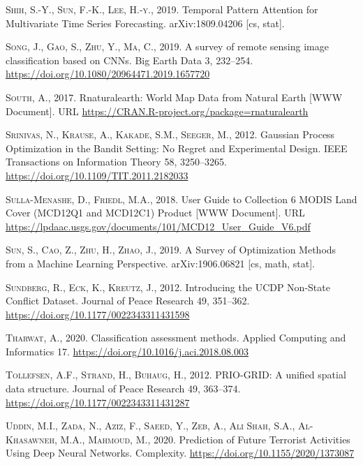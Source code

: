 \documentclass[a4paper,11pt]{article}
\begin{document}
\leavevmode\hypertarget{ref-shih2019}{}%
\textsc{Shih, S.-Y., Sun, F.-K., Lee, H.-y.}, 2019. Temporal Pattern Attention for Multivariate Time Series Forecasting. arXiv:1809.04206 {[}cs, stat{]}.

\leavevmode\hypertarget{ref-song2019}{}%
\textsc{Song, J., Gao, S., Zhu, Y., Ma, C.}, 2019. A survey of remote sensing image classification based on CNNs. Big Earth Data 3, 232--254. \url{https://doi.org/10.1080/20964471.2019.1657720}

\leavevmode\hypertarget{ref-south2017}{}%
\textsc{South, A.}, 2017. Rnaturalearth: World Map Data from Natural Earth {[}WWW Document{]}. URL \url{https://CRAN.R-project.org/package=rnaturalearth}

\leavevmode\hypertarget{ref-srinivas2012}{}%
\textsc{Srinivas, N., Krause, A., Kakade, S.M., Seeger, M.}, 2012. Gaussian Process Optimization in the Bandit Setting: No Regret and Experimental Design. IEEE Transactions on Information Theory 58, 3250--3265. \url{https://doi.org/10.1109/TIT.2011.2182033}

\leavevmode\hypertarget{ref-sulla2018}{}%
\textsc{Sulla-Menashe, D., Friedl, M.A.}, 2018. User Guide to Collection 6 MODIS Land Cover (MCD12Q1 and MCD12C1) Product {[}WWW Document{]}. URL \url{https://lpdaac.usgs.gov/documents/101/MCD12_User_Guide_V6.pdf}

\leavevmode\hypertarget{ref-sun2019}{}%
\textsc{Sun, S., Cao, Z., Zhu, H., Zhao, J.}, 2019. A Survey of Optimization Methods from a Machine Learning Perspective. arXiv:1906.06821 {[}cs, math, stat{]}.

\leavevmode\hypertarget{ref-sundberg2012}{}%
\textsc{Sundberg, R., Eck, K., Kreutz, J.}, 2012. Introducing the UCDP Non-State Conflict Dataset. Journal of Peace Research 49, 351--362. \url{https://doi.org/10.1177/0022343311431598}

\leavevmode\hypertarget{ref-tharwat2020}{}%
\textsc{Tharwat, A.}, 2020. Classification assessment methods. Applied Computing and Informatics 17. \url{https://doi.org/10.1016/j.aci.2018.08.003}

\leavevmode\hypertarget{ref-tollefsen2012}{}%
\textsc{Tollefsen, A.F., Strand, H., Buhaug, H.}, 2012. PRIO-GRID: A unified spatial data structure. Journal of Peace Research 49, 363--374. \url{https://doi.org/10.1177/0022343311431287}

\leavevmode\hypertarget{ref-uddin2020}{}%
\textsc{Uddin, M.I., Zada, N., Aziz, F., Saeed, Y., Zeb, A., Ali Shah, S.A., Al-Khasawneh, M.A., Mahmoud, M.}, 2020. Prediction of Future Terrorist Activities Using Deep Neural Networks. Complexity. \url{https://doi.org/10.1155/2020/1373087}
\end{document}
